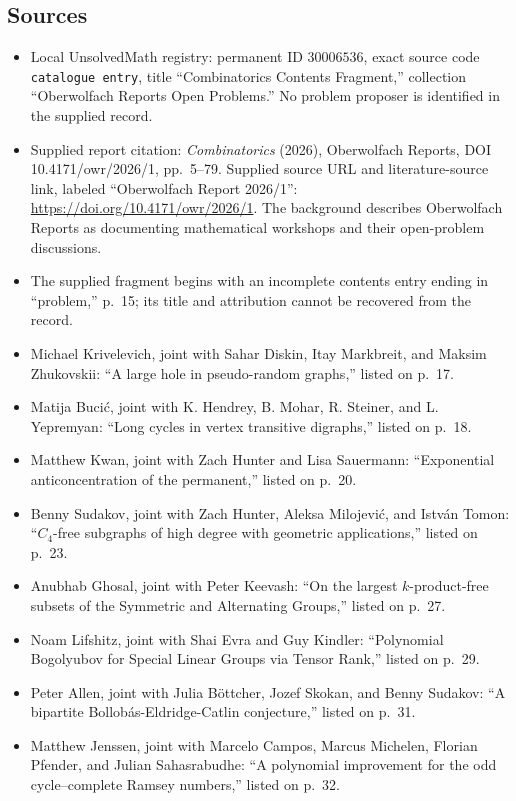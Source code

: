 \documentclass[11pt]{article}
\begin{document}
\subsection{Sources}
\begin{itemize}
\item Local UnsolvedMath registry: permanent ID \(30006536\), exact source code \texttt{catalogue entry}, title ``Combinatorics Contents Fragment,'' collection ``Oberwolfach Reports Open Problems.'' No problem proposer is identified in the supplied record.
\item Supplied report citation: \emph{Combinatorics} (2026), Oberwolfach Reports, DOI 10.4171/owr/2026/1, pp.~5--79. Supplied source URL and literature-source link, labeled ``Oberwolfach Report 2026/1'': \url{https://doi.org/10.4171/owr/2026/1}. The background describes Oberwolfach Reports as documenting mathematical workshops and their open-problem discussions.
\item The supplied fragment begins with an incomplete contents entry ending in ``problem,'' p.~15; its title and attribution cannot be recovered from the record.
\item Michael Krivelevich, joint with Sahar Diskin, Itay Markbreit, and Maksim Zhukovskii: ``A large hole in pseudo-random graphs,'' listed on p.~17.
\item Matija Bucić, joint with K. Hendrey, B. Mohar, R. Steiner, and L. Yepremyan: ``Long cycles in vertex transitive digraphs,'' listed on p.~18.
\item Matthew Kwan, joint with Zach Hunter and Lisa Sauermann: ``Exponential anticoncentration of the permanent,'' listed on p.~20.
\item Benny Sudakov, joint with Zach Hunter, Aleksa Milojević, and István Tomon: ``\(C_4\)-free subgraphs of high degree with geometric applications,'' listed on p.~23.
\item Anubhab Ghosal, joint with Peter Keevash: ``On the largest \(k\)-product-free subsets of the Symmetric and Alternating Groups,'' listed on p.~27.
\item Noam Lifshitz, joint with Shai Evra and Guy Kindler: ``Polynomial Bogolyubov for Special Linear Groups via Tensor Rank,'' listed on p.~29.
\item Peter Allen, joint with Julia Böttcher, Jozef Skokan, and Benny Sudakov: ``A bipartite Bollobás-Eldridge-Catlin conjecture,'' listed on p.~31.
\item Matthew Jenssen, joint with Marcelo Campos, Marcus Michelen, Florian Pfender, and Julian Sahasrabudhe: ``A polynomial improvement for the odd cycle--complete Ramsey numbers,'' listed on p.~32.

\end{itemize}
\end{document}
